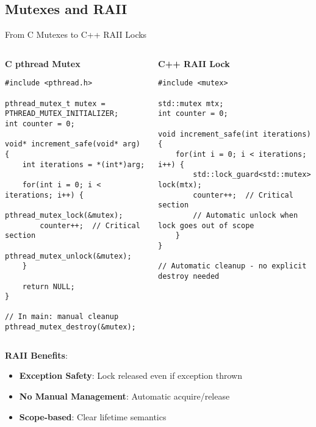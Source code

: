 \subsection{Mutexes and RAII}
\begin{frame}[fragile]{ From C Mutexes to C++ RAII Locks}
	\begin{columns}
		\begin{column}{0.5\textwidth}
			\textbf{C pthread Mutex}
			\begin{verbatim}
#include <pthread.h>

pthread_mutex_t mutex = PTHREAD_MUTEX_INITIALIZER;
int counter = 0;

void* increment_safe(void* arg) {
    int iterations = *(int*)arg;

    for(int i = 0; i < iterations; i++) {
        pthread_mutex_lock(&mutex);
        counter++;  // Critical section
        pthread_mutex_unlock(&mutex);
    }

    return NULL;
}

// In main: manual cleanup
pthread_mutex_destroy(&mutex);
			\end{verbatim}
		\end{column}
		\begin{column}{0.5\textwidth}
			\textbf{C++ RAII Lock}
			\begin{verbatim}
#include <mutex>

std::mutex mtx;
int counter = 0;

void increment_safe(int iterations) {
    for(int i = 0; i < iterations; i++) {
        std::lock_guard<std::mutex> lock(mtx);
        counter++;  // Critical section
        // Automatic unlock when lock goes out of scope
    }
}

// Automatic cleanup - no explicit destroy needed
			\end{verbatim}
		\end{column}
	\end{columns}

	\vspace{0.5em}
	\textbf{RAII Benefits}:
	\begin{itemize}
		\item \textbf{Exception Safety}: Lock released even if exception thrown
		\item \textbf{No Manual Management}: Automatic acquire/release
		\item \textbf{Scope-based}: Clear lifetime semantics
	\end{itemize}
\end{frame}


